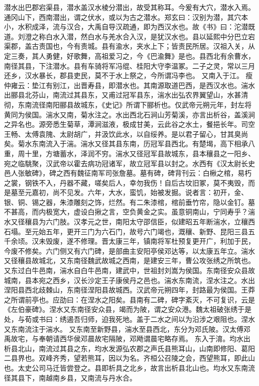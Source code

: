 \documentclass[12pt,UTF8]{ctexbook}
\begin{document}
潜水出巴郡宕渠县，潜水盖汉水棱分潜出，故受其称耳。今爰有大穴，潜水入焉。通冈山下，西南潜出，谓之伏水，或以为古之潜水。郑玄曰：汉别为潜，其穴本小，水积成泽，流与汉合，大禹自导汉疏通，即为西汉水也。故《书》曰：沱潜既道。刘澄之称白水入潜，然白水与羌水合入汉，是犹汉水也。县以延熙中分巴立宕渠郡，盖古责国也，今有责城。县有渝水，夹水上下；皆责民所居。汉祖入关，从定三奏，其人勇健，好歌舞，高祖爱习之，今《巴渝舞》是也。县西北有余曹水，南径其县，下注潜水。县有车骑将军冯绲、桂阳大守李温冢。二子之灵，常以三月还乡，汉水暴长，郡县吏民，莫不于水上祭之，今所谓冯李也。
又南入于江。
瘦仲雍云：垫江有别江，出晋寿县，即潜水也。其南源取道巴西，是西汉水也。湍水出郦县北芬山，南流过其县东，又甫过冠军县东，湍水出弘农界翼望山，水甚清彻，东南流径南阳郦县故城东，《史记》所谓下郦析也。仅武帝元朔元年，封左将黄同为侯国。湍水又南，菊水注之。水出西北石涧山芳菊溪，亦言出析谷，盖溪涧之异名也。源旁悉生菊草，潭涧滋液，极成甘美，云此谷之水土，餐挹长年。司空王畅、太傅袁隗、太尉胡广，并汲饮此水，以自绥养。是以君子留心，甘其臭尚矣。菊水东南流入于湍。湍水又径其县东南，历冠军县西北。有楚堨，高下相承八重，周十里，方塘蓄水，泽润不穷。湍水又径冠军县故城东，县本穰县之一阳乡、宛之临駣聚，汉武帝以霍去病功冠诸军，故立冠军县以封之。水西有《汉太尉长史邑人张敏碑》，碑之西有魏征南军司张詹墓。墓有碑，碑背刊云：白楸之棺，易朽之裳，钢铁不入，丹器不藏，嗟矣后人，幸勿我伤！自后古坟旧冢，莫不夷毁，而是墓至元嘉初，尚不见发。六年，大水，蛮饥，始被发掘。说者言：初开，金、银、铜、锡之器，朱漆雕刻之饰，烂然。有二朱漆棺，棺前垂竹帘，隐以金钉。墓不甚高，而内极宽大，虚设白揪之言，空负黄金之实。虽意铜南山，宁同寿乎？湍水又径穰县为六门肢。汉孝元之世，南阳太守邵信臣，似建昭五年断湍水，立穰西石塌。至元始五年，更开三门为六石门，故号六门竭也，溉穰、新野、昆阳三县五千余顷。汉未毁废，遂不修理。晋太康三年，镇南将军杜预复更开广，利加于民，今废不修矣。六门侧又有六门碑，是部曲主安阳亭侯邓达等，以太康五年立。湍水又径穰县故城北，又东南径魏武故城之西南，是建安三年，曹公攻张绣之所筑也。
又东过白牛邑南，湍水自白牛邑南，建武中，世祖封刘嵩为侯国。东南径安众县故城南，县本宛之西乡，汉长沙定王子康侯丹之邑也。湍水东南流，涅水注之。水出涅阳县西北歧棘山，东南径涅阳县故城西。汉武帝元朔四年，封路最为侯国。王莽之所谓前亭也。应劭曰：在涅水之阳矣。县南有二碑，碑字紊灭，不可复识，云是《左伯豪碑》。涅水又东南径安众县，竭而为陂，谓之安众港。魏太祖破张绣于是处，与荀或书曰：绣遏吾归师，迫我死地。盖于二水之间以为沿涉之艰阻也。涅水又东南流注于湍水。
又东南至新野县，湍水至县西北，东分为邓氏陂。汉太傅邓禹故宅，与奉朝请西华侯邓晨故宅隔陂，邓飏谓晨宅略存焉。
东入于淯。均水出析县北山，南流过其县之东，均水发源弘农郡之声氏县熊耳山，山南即修阳、葛阳二县界也。双峰齐秀，望若熊耳，因以为名。齐桓公召陵之会，西望熊耳，即此山也。太史公司马迁皆尝登之。县即析具之北乡，故言出析县北山也。均水又东南流径其县下，南越南乡县，又南流与丹水合。
\end{document}
